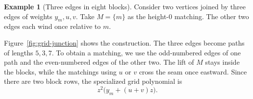 \documentclass[11pt]{article}
\theoremstyle{definition}
\newtheorem{example}[theorem]{Example}
\theoremstyle{remark}
\begin{document}

\begin{example}[Three edges in eight blocks]\label{ex:grid-junction}
Consider two vertices joined by three edges of weights
$y_m,u,v$. Take $M=\{m\}$ as the height-$0$ matching.
The other two edges each wind once relative to $m$.

Figure~\ref{fig:grid-junction} shows the construction.
The three edges become paths of lengths $5,3,7$.
To obtain a matching, we use the odd-numbered edges
of one path and the even-numbered edges of the other two.
The lift of $M$ stays inside the blocks, while the
matchings using $u$ or $v$ cross the seam once
eastward. Since there are two block rows, the
specialized grid polynomial is
\[
z^2\bigl(y_m+(u+v)z\bigr).
\]
\end{example}
\end{document}

